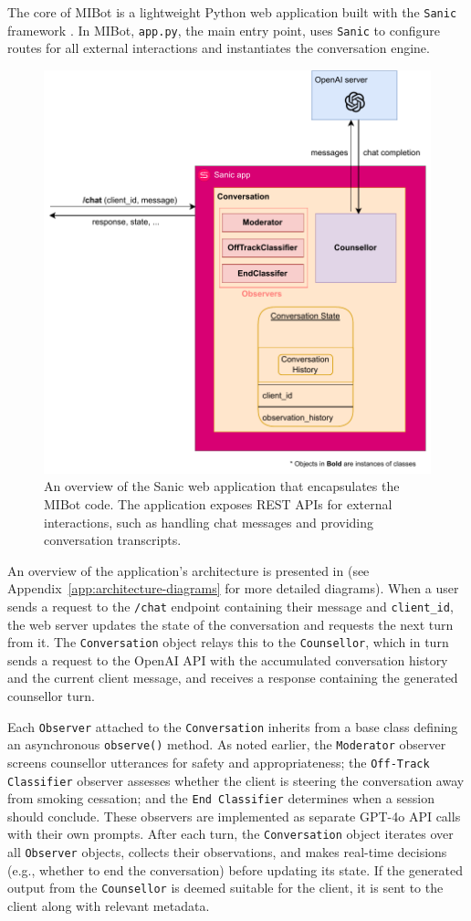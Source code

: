The core of MIBot is a lightweight Python web application built with the \texttt{Sanic} framework \citep{pi_sanic}. In MIBot, \texttt{app.py}, the main entry point, uses \texttt{Sanic} to configure routes for all external interactions and instantiates the conversation engine.
\begin{figure}[ht]
  \centering
  \includegraphics[width=0.7\linewidth]{fig/microservice.drawio.pdf} 
  \caption[MIBot Sanic Application Overview]{An overview of the Sanic web application that encapsulates the MIBot code. The application exposes REST APIs for external interactions, such as handling chat messages and providing conversation transcripts.}
  \label{fig:microservice}
\end{figure}
An overview of the application's architecture is presented in  (see Appendix~\ref{app:architecture-diagrams} for more detailed diagrams). When a user sends a request to the \texttt{/chat} endpoint containing their message and \texttt{client\_id}, the web server updates the state of the conversation and requests the next turn from it. The \texttt{Conversation} object relays this to the \texttt{Counsellor}, which in turn sends a request to the OpenAI API with the accumulated conversation history and the current client message, and receives a response containing the generated counsellor turn.

Each \texttt{Observer} attached to the \texttt{Conversation} inherits from a base class defining an asynchronous \texttt{observe()} method. As noted earlier, the \texttt{Moderator} observer screens counsellor utterances for safety and appropriateness; the \texttt{Off-Track Classifier} observer assesses whether the client is steering the conversation away from smoking cessation; and the \texttt{End Classifier} determines when a session should conclude. These observers are implemented as separate GPT-4o API calls with their own prompts. After each turn, the \texttt{Conversation} object iterates over all \texttt{Observer} objects, collects their observations, and makes real-time decisions (e.g., whether to end the conversation) before updating its state. If the generated output from the \texttt{Counsellor} is deemed suitable for the client, it is sent to the client along with relevant metadata.


